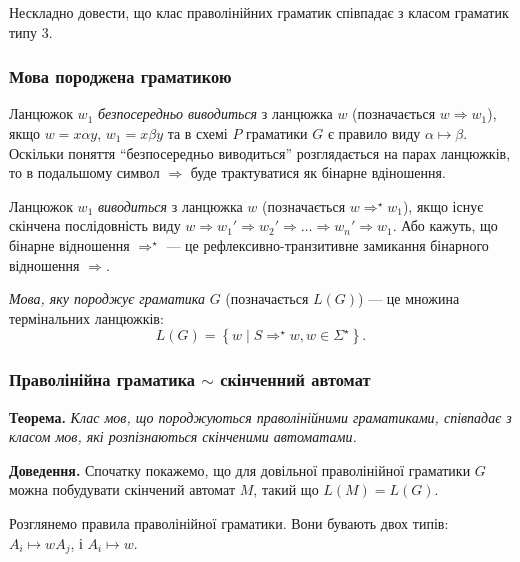 Нескладно довести, що клас праволінійних граматик співпадає з класом граматик типу 3.

\subsubsection{Мова породжена граматикою}

Ланцюжок $w_1$ \textit{безпосередньо виводиться} з ланцюжка $w$ (позначається $w \Rightarrow w_1$), якщо $w = x \alpha y$, $w_1 = x \beta y$ та в схемі $P$ граматики $G$ є правило виду $\alpha \mapsto \beta$. Оскільки поняття ``безпосередньо виводиться'' розглядається на парах ланцюжків, то в подальшому символ $\Rightarrow$ буде трактуватися як бінарне вдіношення. \medskip

Ланцюжок $w_1$ \textit{виводиться} з ланцюжка $w$ (позначається $w \Rightarrow^\star w_1$), якщо існує скінчена послідовність виду $w \Rightarrow w_1' \Rightarrow w_2' \Rightarrow \ldots \Rightarrow w_n' \Rightarrow w_1$. Або кажуть, що бінарне відношення $\Rightarrow^\star$ --- це рефлексивно-транзитивне замикання бінарного відношення $\Rightarrow$. \medskip

\textit{Мова, яку породжує граматика} $G$ (позначається $L(G)$) --- це множина термінальних ланцюжків: 
\[ L(G) = \left\{ w \mid S \Rightarrow^\star w, w \in \Sigma^\star \right\}.\]

\subsubsection{Праволінійна граматика $\sim$ скінченний автомат}

\textbf{Теорема.} \textit{Клас мов, що породжуються праволінійними граматиками, співпадає з класом мов, які розпізнаються скінченими автоматами.}

\textbf{Доведення.} Спочатку покажемо, що для довільної праволінійної граматики $G$ можна побудувати скінчений автомат $M$, такий що $L(M) = L(G)$. \medskip

Розглянемо правила праволінійної граматики. Вони бувають двох типів: $A_i \mapsto w A_j$, і $A_i \mapsto w$. \medskip

